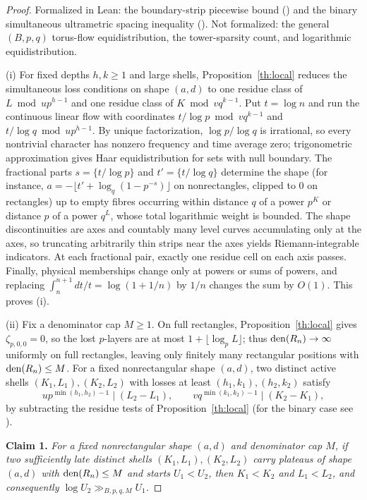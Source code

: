 \documentclass[11pt]{article}
\begin{document}
\begin{proof}
Formalized in Lean: the boundary-strip piecewise bound () and the binary simultaneous ultrametric spacing inequality (). Not formalized: the general $(B,p,q)$ torus-flow equidistribution, the tower-sparsity count, and logarithmic equidistribution.

(i) For fixed depths $h,k\ge1$ and large shells, Proposition~\ref{th:local} reduces the simultaneous loss conditions on shape $(a,d)$ to one residue class of $L\bmod up^{h-1}$ and one residue class of $K\bmod vq^{k-1}$. Put $t=\log n$ and run the continuous linear flow with coordinates $t/\log p\bmod vq^{k-1}$ and $t/\log q\bmod up^{h-1}$. By unique factorization, $\log p/\log q$ is irrational, so every nontrivial character has nonzero frequency and time average zero; trigonometric approximation gives Haar equidistribution for sets with null boundary. The fractional parts $s=\{t/\log p\}$ and $t'=\{t/\log q\}$ determine the shape (for instance, $a=-\lfloor t'+\log_q(1-p^{-s})\rfloor$ on nonrectangles, clipped to $0$ on rectangles) up to empty fibres occurring within distance $q$ of a power $p^K$ or distance $p$ of a power $q^L$, whose total logarithmic weight is bounded. The shape discontinuities are axes and countably many level curves accumulating only at the axes, so truncating arbitrarily thin strips near the axes yields Riemann-integrable indicators. At each fractional pair, exactly one residue cell on each axis passes. Finally, physical memberships change only at powers or sums of powers, and replacing $\int_n^{n+1}dt/t=\log(1+1/n)$ by $1/n$ changes the sum by $O(1)$. This proves (i).

(ii) Fix a denominator cap $M\ge1$. On full rectangles, Proposition~\ref{th:local} gives $\zeta_{p,0,0}=0$, so the lost $p$-layers are at most $1+\lfloor\log_p L\rfloor$; thus $\operatorname{den}(R_n)\to\infty$ uniformly on full rectangles, leaving only finitely many rectangular positions with $\operatorname{den}(R_n)\le M$. For a fixed nonrectangular shape $(a,d)$, two distinct active shells $(K_1,L_1),(K_2,L_2)$ with losses at least $(h_1,k_1),(h_2,k_2)$ satisfy
\[
 up^{\min(h_1,h_2)-1}\mid(L_2-L_1),\qquad
 vq^{\min(k_1,k_2)-1}\mid(K_2-K_1),
\]
by subtracting the residue tests of Proposition~\ref{th:local} (for the binary case see ).

\smallskip\noindent\textbf{Claim 1.} \emph{For a fixed nonrectangular shape $(a,d)$ and denominator cap $M$, if two sufficiently late distinct shells $(K_1,L_1),(K_2,L_2)$ carry plateaus of shape $(a,d)$ with $\operatorname{den}(R_n)\le M$ and starts $U_1<U_2$, then $K_1<K_2$ and $L_1<L_2$, and consequently $\log U_2\gg_{B,p,q,M} U_1$.}


\end{proof}
\end{document}
